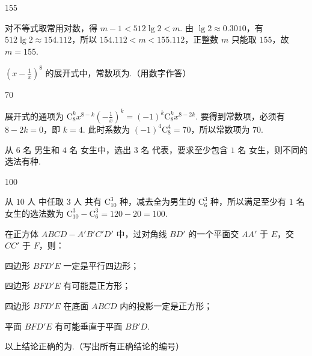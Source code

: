 \begin{answer}
155
\end{answer}

\begin{solution}
对不等式取常用对数，得 \(m-1<512\lg2<m\).  由 \(\lg2\approx0.3010\)，有 \(512\lg2\approx154.112\)，所以 \(154.112<m<155.112\)，正整数 \(m\) 只能取 \(155\)，故 \(m=155\).
\end{solution}

\begin{problem}
\(\left(x - \frac{1}{x}\right)^8\) 的展开式中，常数项为\fillinblank{}.（用数字作答）
\end{problem}

\begin{answer}
70
\end{answer}

\begin{solution}
展开式的通项为 \(\mathrm C_{8}^{k}x^{8-k}\left(-\frac{1}{x}\right)^{k}=(-1)^{k}\mathrm C_{8}^{k}x^{8-2k}\). 要得到常数项，必须有 \(8-2k=0\)，即 \(k=4\). 此时系数为 \((-1)^{4}\mathrm C_{8}^{4}=70\)，所以常数项为 \(70\).
\end{solution}

\begin{problem}
从 \(6\text{ 名}\) 男生和 \(4\text{ 名}\) 女生中，选出 \(3\text{ 名}\) 代表，要求至少包含 \(1\text{ 名}\) 女生，则不同的选法有\fillinblank{}\(\text{种}\).
\end{problem}

\begin{answer}
100
\end{answer}

\begin{solution}
从 \(10\text{ 人}\) 中任取 \(3\text{ 人}\) 共有 \(\mathrm C_{10}^{3}\) 种，减去全为男生的 \(\mathrm C_{6}^{3}\) 种，所以满足至少有 \(1\text{ 名}\) 女生的选法数为 \(\mathrm C_{10}^{3}-\mathrm C_{6}^{3}=120-20=100\).
\end{solution}

\begin{problem}
在正方体 \(ABCD-A'B'C'D'\) 中，过对角线 \(BD'\) 的一个平面交 \(AA'\) 于 \(E\)，交 \(CC'\) 于 \(F\)，则：

\begin{circlelist}
    \item 四边形 \(BFD'E\) 一定是平行四边形；
    \item 四边形 \(BFD'E\) 有可能是正方形；
    \item 四边形 \(BFD'E\) 在底面 \(ABCD\) 内的投影一定是正方形；
    \item 平面 \(BFD'E\) 有可能垂直于平面 \(BB'D\).
\end{circlelist}

以上结论正确的为\fillinblank{}.（写出所有正确结论的编号）
\end{problem}

